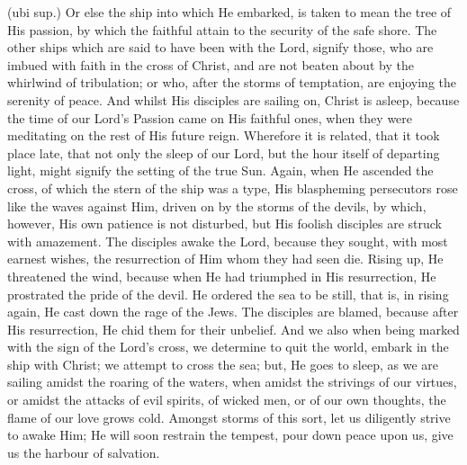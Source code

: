  (ubi sup.) Or else the ship into which He embarked, is taken to mean the tree of His passion, by which the faithful attain to the security of the safe shore. The other ships which are said to have been with the Lord, signify those, who are imbued with faith in the cross of Christ, and are not beaten about by the whirlwind of tribulation; or who, after the storms of temptation, are enjoying the serenity of peace. And whilst His disciples are sailing on, Christ is asleep, because the time of our Lord’s Passion came on His faithful ones, when they were meditating on the rest of His future reign. Wherefore it is related, that it took place late, that not only the sleep of our Lord, but the hour itself of departing light, might signify the setting of the true Sun. Again, when He ascended the cross, of which the stern of the ship was a type, His blaspheming persecutors rose like the waves against Him, driven on by the storms of the devils, by which, however, His own patience is not disturbed, but His foolish disciples are struck with amazement. The disciples awake the Lord, because they sought, with most earnest wishes, the resurrection of Him whom they had seen die. Rising up, He threatened the wind, because when He had triumphed in His resurrection, He prostrated the pride of the devil. He ordered the sea to be still, that is, in rising again, He cast down the rage of the Jews. The disciples are blamed, because after His resurrection, He chid them for their unbelief. And we also when being marked with the sign of the Lord’s cross, we determine to quit the world, embark in the ship with Christ; we attempt to cross the sea; but, He goes to sleep, as we are sailing amidst the roaring of the waters, when amidst the strivings of our virtues, or amidst the attacks of evil spirits, of wicked men, or of our own thoughts, the flame of our love grows cold. Amongst storms of this sort, let us diligently strive to awake Him; He will soon restrain the tempest, pour down peace upon us, give us the harbour of salvation.


